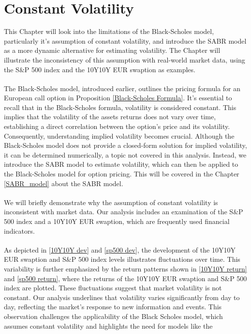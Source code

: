 \section{Constant Volatility} \label{cont_vol}
This Chapter will look into the limitations 
of the Black-Scholes model, particularly it's 
assumption of constant volatility, and introduce 
the SABR model as a more dynamic alternative for estimating volatility. 
The Chapter will illustrate the inconsistency of 
this assumption with real-world market data, 
using the S$\&$P 500 index and the 10Y10Y EUR swaption 
as examples.
\\\\
The Black-Scholes model, introduced earlier, outlines the pricing formula for an European call option in 
Proposition \autoref{Black-Scholes Formula}. It's  essential to recall that in the Black-Scholes formula, 
volatility is considered constant. This implies that the volatility of the assets returns does not vary over time,
establishing a direct correlation between the option's price and its volatility. Consequently, 
understanding implied volatility becomes crucial. Although the Black-Scholes model does not provide 
a closed-form solution for implied volatility, it can be determined numerically, a topic not covered 
in this analysis. Instead, we introduce the SABR model to estimate volatility, which can then be 
applied to the Black-Scholes model for option pricing. This will be covered in the Chapter \ref{SABR_model} about the 
SABR model. 
\\\\
We will briefly demonstrate why the assumption of constant volatility is inconsistent with market data. 
Our analysis includes an examination of the S$\&$P 500 index and a 10Y10Y EUR swaption, which are frequently used 
financial indicators. 
\\\\
As depicted in \autoref{10Y10Y dev} and \autoref{sp500 dev}, the development of the 10Y10Y EUR swaption 
and S$\&$P 500 index levels illustrates fluctuations over time. This variability is further emphasized by the return patterns 
shown in \autoref{10Y10Y return} and \autoref{sp500 return}, where the returns of the 10Y10Y EUR swaption and S$\&$P 500 index are plotted. 
These fluctuations suggest that market volatility is not constant. Our analysis underlines that volatility varies 
significantly from day to day, reflecting the market's response to new information and events. This observation challenges 
the applicability of the Black Scholes model, which assumes constant volatility and highlights the need for models like the 
